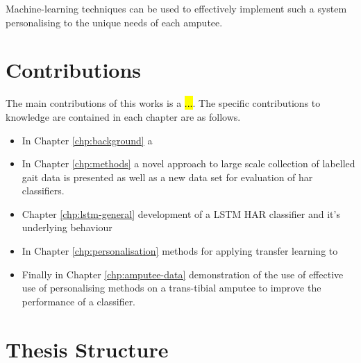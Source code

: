 Machine-learning techniques can be used to effectively implement such a system personalising to the unique needs of each amputee.



\section{Contributions}
The main contributions of this works is a \hl{...}. The specific contributions to knowledge are
contained in each chapter are as follows.

\begin{itemize}
    \item In Chapter \ref{chp:background} a
    
    \item In Chapter \ref{chp:methods} a novel approach to large scale collection of labelled gait data is presented as well as a new data set for evaluation of \acrshort{har} classifiers.
    
    \item Chapter \ref{chp:lstm-general} development of a LSTM HAR classifier and it's underlying behaviour
    
    \item In Chapter \ref{chp:personalisation} methods for applying transfer learning to 
    
    \item Finally in Chapter \ref{chp:amputee-data} demonstration of the use of effective use of personalising methods on a trans-tibial amputee to improve the performance of a classifier.
\end{itemize}

\section{Thesis Structure}
